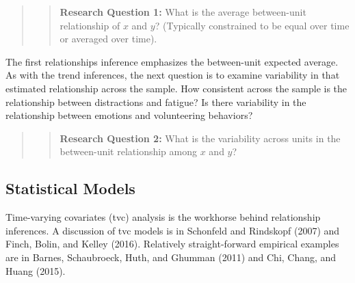 \documentclass[english,,man]{apa6}
\theoremstyle{definition}
\theoremstyle{definition}
\theoremstyle{definition}
\theoremstyle{remark}
\begin{document}
\begin{quote}
\begin{quote}
\textbf{Research Question 1:} What is the average between-unit
relationship of \(x\) and \(y\)? (Typically constrained to be equal over
time or averaged over time).
\end{quote}
\end{quote}

The first relationships inference emphasizes the between-unit expected
average. As with the trend inferences, the next question is to examine
variability in that estimated relationship across the sample. How
consistent across the sample is the relationship between distractions
and fatigue? Is there variability in the relationship between emotions
and volunteering behaviors?

\begin{quote}
\begin{quote}
\textbf{Research Question 2:} What is the variability across units in
the between-unit relationship among \(x\) and \(y\)?
\end{quote}
\end{quote}

\hypertarget{statistical-models-1}{%
\subsection{Statistical Models}\label{statistical-models-1}}

Time-varying covariates (tvc) analysis is the workhorse behind
relationship inferences. A discussion of tvc models is in Schonfeld and
Rindskopf (2007) and Finch, Bolin, and Kelley (2016). Relatively
straight-forward empirical examples are in Barnes, Schaubroeck, Huth,
and Ghumman (2011) and Chi, Chang, and Huang (2015).
\end{document}
